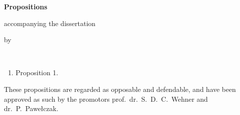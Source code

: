 \begin{center}

{\Large\titlefont\bfseries Propositions}

\medskip

accompanying the dissertation

\medskip

{\makeatletter
\titlestyle\bfseries\large\@title
\makeatother}

{\makeatletter
\ifx\@subtitle\undefined\else
\titlefont\titleshape\@subtitle
\fi
\makeatother}

\medskip

by

\medskip

\makeatletter
{\large\titlefont\bfseries\@firstname\ {\titleshape\@lastname}}
\makeatother

\end{center}

\bigskip

\begin{enumerate}
\item Proposition 1.
\end{enumerate}

\bigskip
\bigskip

\begin{center}
These propositions are regarded as opposable and defendable, and have been approved as such by the
promotors prof.\ dr.\ S.\ D.\ C.\ Wehner and dr.\ P.\ Pawełczak.
\end{center}
